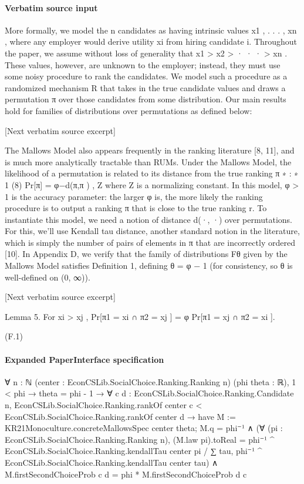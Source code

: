 \documentclass[10pt]{article}
\begin{document}
\paragraph{Verbatim source input}
\begin{ReviewVerbatim}
More formally, we model the n candidates as having intrinsic values x1 , . . . , xn , where any employer would
derive utility xi from hiring candidate i. Throughout the paper, we assume without loss of generality that
x1 > x2 > · · · > xn . These values, however, are unknown to the employer; instead, they must use some
noisy procedure to rank the candidates. We model such a procedure as a randomized mechanism R that
takes in the true candidate values and draws a permutation π over those candidates from some distribution.
Our main results hold for families of distributions over permutations as defined below:

[Next verbatim source excerpt]

The Mallows Model also appears frequently in the ranking literature [8, 11], and is much more analytically
tractable than RUMs. Under the Mallows Model, the likelihood of a permutation is related to its distance
from the true ranking π ∗ :
∗
1
(8)
Pr[π] = φ−d(π,π ) ,
Z
where Z is a normalizing constant. In this model, φ > 1 is the accuracy parameter: the larger φ is, the
more likely the ranking procedure is to output a ranking π that is close to the true ranking r. To instantiate
this model, we need a notion of distance d(·, ·) over permutations. For this, we’ll use Kendall tau distance,
another standard notion in the literature, which is simply the number of pairs of elements in π that are
incorrectly ordered [10]. In Appendix D, we verify that the family of distributions Fθ given by the Mallows
Model satisfies Definition 1, defining θ = φ − 1 (for consistency, so θ is well-defined on (0, ∞)).

[Next verbatim source excerpt]

Lemma 5. For xi > xj ,
Pr[π1 = xi ∩ π2 = xj ] = φ Pr[π1 = xj ∩ π2 = xi ].

(F.1)
\end{ReviewVerbatim}


\paragraph{Expanded PaperInterface specification}
\begin{ReviewVerbatim}
∀ {n : ℕ} (center : EconCSLib.SocialChoice.Ranking.Ranking n) (phi theta : ℝ),
  1 < phi →
    theta = phi - 1 →
      ∀ {c d : EconCSLib.SocialChoice.Ranking.Candidate n},
        EconCSLib.SocialChoice.Ranking.rankOf center c < EconCSLib.SocialChoice.Ranking.rankOf center d →
          have M := KR21Monoculture.concreteMallowsSpec center theta;
          M.q = phi⁻¹ ∧
            (∀ (pi : EconCSLib.SocialChoice.Ranking.Ranking n),
                (M.law pi).toReal =
                  phi⁻¹ ^ EconCSLib.SocialChoice.Ranking.kendallTau center pi /
                    ∑ tau, phi⁻¹ ^ EconCSLib.SocialChoice.Ranking.kendallTau center tau) ∧
              M.firstSecondChoiceProb c d = phi * M.firstSecondChoiceProb d c
\end{ReviewVerbatim}
\end{document}
